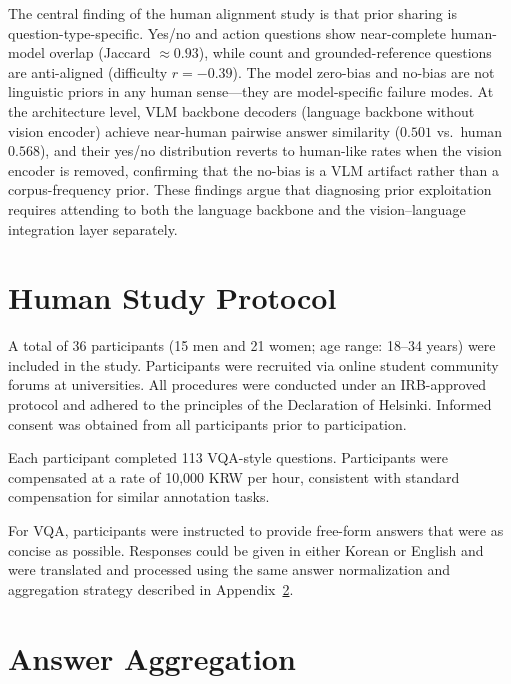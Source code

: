 \documentclass[letterpaper]{article}
\begin{document}
The central finding of the human alignment study is that prior sharing is
question-type-specific. Yes/no and action questions show near-complete
human-model overlap (Jaccard $\approx 0.93$), while count and grounded-reference
questions are anti-aligned (difficulty $r = -0.39$). The model zero-bias and
no-bias are not linguistic priors in any human sense---they are model-specific
failure modes. At the architecture level, VLM backbone decoders
(language backbone without vision encoder) achieve near-human pairwise answer
similarity ($0.501$ vs.\ human $0.568$), and their yes/no distribution reverts
to human-like rates when the vision encoder is removed, confirming that the
no-bias is a VLM artifact rather than a corpus-frequency prior. These findings argue that diagnosing prior exploitation requires attending to both
the language backbone and the vision--language integration layer separately.



\appendix

\section{Human Study Protocol}
\label{app:human}

A total of 36 participants (15 men and 21 women; age range: 18--34 years) were
included in the study. Participants were recruited via online student community
forums at universities. All procedures were conducted under an IRB-approved
protocol and adhered to the principles of the Declaration of Helsinki. Informed
consent was obtained from all participants prior to participation.

Each participant completed 113 VQA-style questions. Participants were
compensated at a rate of 10,000 KRW per hour, consistent with standard
compensation for similar annotation tasks.

For VQA, participants were instructed to provide free-form answers that were as
concise as possible. Responses could be given in either Korean or English and
were translated and processed using the same answer normalization and aggregation
strategy described in Appendix~\ref{app:aggregation}.

\section{Answer Aggregation}
\label{app:aggregation}
\end{document}
